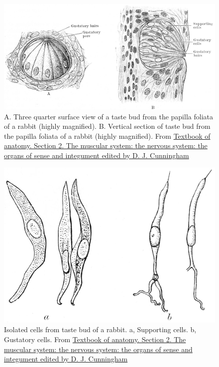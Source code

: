 \begin{figure}

{\centering \includegraphics[width=0.7\linewidth]{./figures/gustatory/CunninghamSection2Page771} 

}

\caption{A. Three quarter surface view of a taste bud from the papilla foliata of a rabbit (highly magnified). B. Vertical section of taste bud from the papilla foliata of a rabbit (highly magnified). From \href{https://wellcomelibrary.org/item/b21271070}{Textbook of anatomy. Section 2. The muscular system: the nervous system: the organs of sense and integument edited by D. J. Cunningham}}\label{fig:tastebuds}
\end{figure}



\begin{figure}

{\centering \includegraphics[width=0.7\linewidth]{./figures/gustatory/CunninghamSection2Page771Cells} 

}

\caption{Isolated cells from taste bud of a rabbit. a, Supporting cells. b, Gustatory cells. From \href{https://wellcomelibrary.org/item/b21271070}{Textbook of anatomy. Section 2. The muscular system: the nervous system: the organs of sense and integument edited by D. J. Cunningham}}\label{fig:tastecells}
\end{figure}


